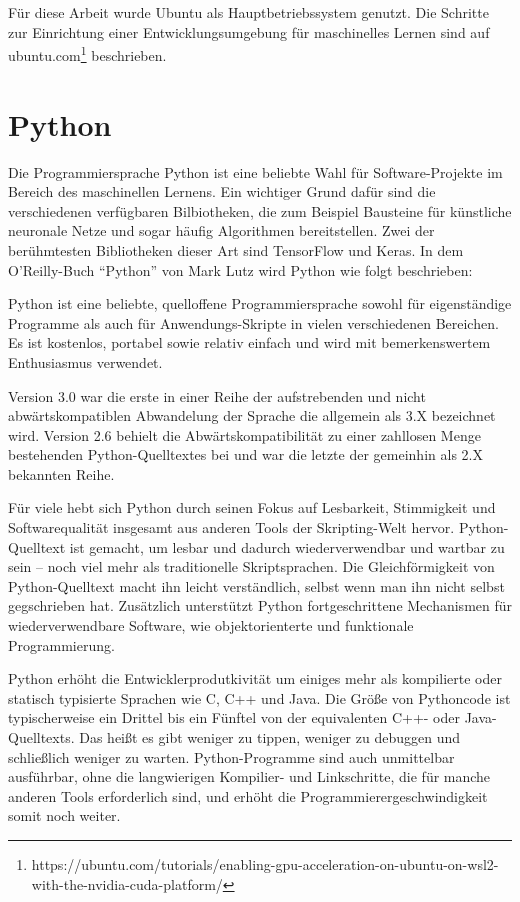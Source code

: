 Für diese Arbeit wurde Ubuntu als Hauptbetriebssystem genutzt. Die Schritte zur Einrichtung einer Entwicklungsumgebung für maschinelles Lernen sind auf ubuntu.com\footnote{https://ubuntu.com/tutorials/enabling-gpu-acceleration-on-ubuntu-on-wsl2-with-the-nvidia-cuda-platform/} beschrieben.

\section{Python}
\label{sec:python}
Die Programmiersprache Python ist eine beliebte Wahl für Software-Projekte im Bereich des maschinellen Lernens. Ein wichtiger Grund dafür sind die verschiedenen verfügbaren Bilbiotheken, die zum Beispiel Bausteine für künstliche neuronale Netze und sogar häufig Algorithmen bereitstellen. Zwei der berühmtesten Bibliotheken dieser Art sind TensorFlow und Keras. In dem O'Reilly-Buch ``Python'' von Mark Lutz \cite{lutz2013python} wird Python wie folgt beschrieben:

Python ist eine beliebte, quelloffene Programmiersprache sowohl für eigenständige Programme als auch für Anwendungs-Skripte in vielen verschiedenen Bereichen. Es ist kostenlos, portabel sowie relativ einfach und wird  mit bemerkenswertem Enthusiasmus verwendet.

Version 3.0 war die erste in einer Reihe der aufstrebenden und nicht abwärtskompatiblen Abwandelung der Sprache die allgemein als 3.X bezeichnet wird. Version 2.6 behielt die Abwärtskompatibilität zu einer zahllosen Menge bestehenden Python-Quelltextes bei und war die letzte der gemeinhin als 2.X bekannten Reihe.

Für viele hebt sich Python durch seinen Fokus auf Lesbarkeit, Stimmigkeit und Softwarequalität insgesamt aus anderen Tools der Skripting-Welt hervor. Python-Quelltext ist gemacht, um lesbar und dadurch wiederverwendbar und wartbar zu sein -- noch viel mehr als traditionelle Skriptsprachen. Die Gleichförmigkeit von Python-Quelltext macht ihn leicht verständlich, selbst wenn man ihn nicht selbst gegschrieben hat. Zusätzlich unterstützt Python fortgeschrittene Mechanismen für wiederverwendbare Software, wie objektorienterte und funktionale Programmierung.

Python erhöht die Entwicklerprodutkivität um einiges mehr als kompilierte oder statisch typisierte Sprachen wie C, C++ und Java. Die Größe von Pythoncode ist typischerweise ein Drittel bis ein Fünftel von der equivalenten C++- oder Java-Quelltexts. Das heißt es gibt weniger zu tippen, weniger zu debuggen und schließlich weniger zu warten. Python-Programme sind auch unmittelbar ausführbar, ohne die langwierigen Kompilier- und Linkschritte, die für manche anderen Tools erforderlich sind, und erhöht die Programmierergeschwindigkeit somit noch weiter.

